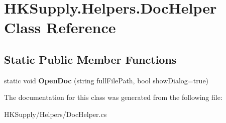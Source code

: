 \hypertarget{class_h_k_supply_1_1_helpers_1_1_doc_helper}{}\section{H\+K\+Supply.\+Helpers.\+Doc\+Helper Class Reference}
\label{class_h_k_supply_1_1_helpers_1_1_doc_helper}
\subsection*{Static Public Member Functions}
\begin{DoxyCompactItemize}
\item 
\mbox{\label{class_h_k_supply_1_1_helpers_1_1_doc_helper_af030561f9e4cfac0d7c8be5b03bd9123}} 
static void {\bfseries Open\+Doc} (string full\+File\+Path, bool show\+Dialog=true)
\end{DoxyCompactItemize}


The documentation for this class was generated from the following file\+:\begin{DoxyCompactItemize}
\item 
H\+K\+Supply/\+Helpers/Doc\+Helper.\+cs\end{DoxyCompactItemize}
